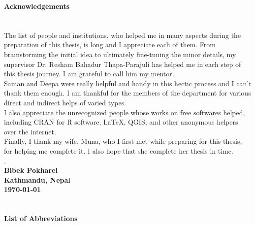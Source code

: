 \newpage
\begin{center}
\textbf{\large Acknowledgements}
\end{center}
\section*{}

\vspace{-10mm} 
The list of people and institutions, who helped me in many aspects during the preparation of this thesis, is long and  I appreciate each of them. From brainstorming the initial idea to ultimately fine-tuning the minor details, my supervisor Dr. Resham Bahadur Thapa-Parajuli has helped me in each step of this thesis journey. I am grateful to call him my mentor. \\
Saman and Deepa were really helpful and handy in this hectic process and I can't thank them enough. I am thankful for the members of the department for various direct and indirect helps of varied types.\\
I also appreciate the unrecognized people whose works on free softwares helped, including CRAN for R software, \LaTeX{}, QGIS, and other anonymous helpers over the internet.\\
Finally, I thank my wife, Muna, who I first met while preparing for this thesis, for helping me complete it. I also hope that she complete her thesis in time.\\
.\vspace{5mm}\\ 
\textbf{Bibek Pokharel}\\
\textbf{Kathmandu, Nepal}\\
\textbf{\today}

\newpage
\begin{center}
\tableofcontents
\end{center}

\newpage
\begin{center}
\listoftables

\section*{}


\listoffigures
\section*{}


\newpage
\textbf{\large List of Abbreviations}
\end{center}
